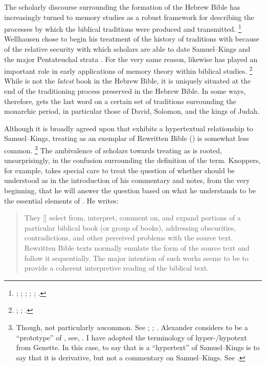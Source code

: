  The scholarly discourse surrounding the formation of the Hebrew Bible has increasingly turned to memory studies as a robust framework for describing the processes by which the biblical traditions were produced and transmitted.%
    \footnote{%
        \cite{wright2014};
        \cite{blenkinsopp2013};
        \cite{rogerson2010};
        \cite{davies2008};
        \cite{hendel2005};
        \cite{smith_cbq2002}.}
Wellhausen chose to begin his treatment of the history of traditions with \chronicles because of the relative security with which scholars are able to date Samuel--Kings and the major Pentateuchal strata \visavis \chronicles. For the very same reason, \chronicles likewise has played an important role in early applications of memory theory within biblical studies.%
    \footnote{%
        \cite{benzvi_st2017};
        \cite{benzvi-a_evans-williams2013};
        \cite{benzvi-b_evans-williams2013}.}
While \chronicles is not the \emph{latest} book in the Hebrew Bible, it is uniquely situated at the end of the traditioning process preserved in the Hebrew Bible. In some ways, therefore, \chronicles gets the last word on a certain set of traditions surrounding the monarchic period, in particular those of David, Solomon, and the kings of Judah. 

Although it is broadly agreed upon that \chronicles exhibits a hypertextual relationship to Samuel--Kings, treating \chronicles as an exemplar of Rewritten Bible (\rwb) is somewhat less common.%
    \footnote{Though, not particularly \emph{un}common. See 
        \cite{campbell_zsengeller2014};
        \cite{zahn_lim-collins2010};
        \cite{bernstein_textus2005}.
        Alexander considers \chronicles to be a ``prototype'' of \rwb, see, 
        \cite[100]{alexander_carson-williamson1988}.
        I have adopted the terminology of hyper-/hypotext from Genette. In this case, to say that \chronicles is a ``hypertext'' of Samuel--Kings is to say that it is derivative, but not a commentary on Samuel--Kings. See
        \cite[5]{genette1997}.}
The ambivalence of scholars towards treating \chronicles as \rwb is rooted, unsurprisingly, in the confusion surrounding the definition of the term. Knoppers, for example, takes special care to treat the question of whether \chronicles should be understood as \rwb in the introduction of his commentary and notes, from the very beginning, that he will answer the question based on what he understands to be the essential elements of \rwb.\autocite[129--134]{knoppers2003} He writes: 

 \begin{quote}
    They [\rwb] select from, interpret, comment on, and expand portions of a particular biblical book (or group of books), addressing obscurities, contradictions, and other perceived problems with the source text. Rewritten Bible texts normally emulate the form of the source text and follow it sequentially. The major intention of such works seems to be to provide a coherent interpretive reading of the biblical text.\autocite[130]{knoppers2003}
\end{quote} 

